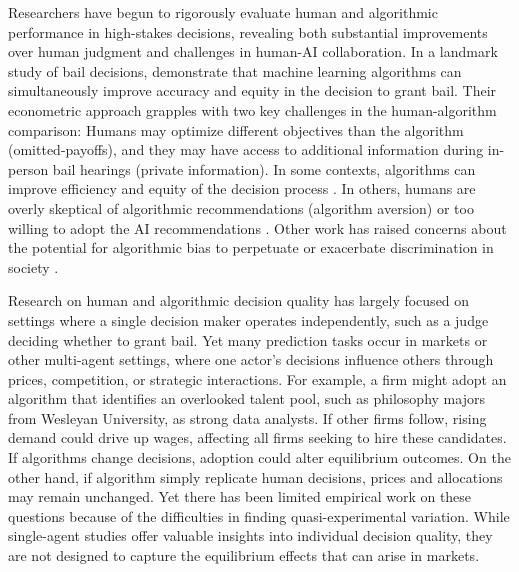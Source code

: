 \documentclass[11pt]{article}
\begin{document}
Researchers have begun to rigorously evaluate human and algorithmic performance in high-stakes decisions, revealing both substantial improvements over human judgment and challenges in human-AI collaboration. In a landmark study of bail decisions, \citet{kleinberg2017} demonstrate that machine learning algorithms can simultaneously improve accuracy and equity in the decision to grant bail. Their econometric approach grapples with two key challenges in the human-algorithm comparison: Humans may optimize different objectives than the algorithm (omitted-payoffs), and they may have access to additional information during in-person bail hearings (private information). %
In some contexts, algorithms can improve efficiency and equity of the decision process \citep[e.g.][]{li_hiring_2025, mullainathan_diagnosing_2022, rambachanIdentifyingPredictionMistakes, brynjolfsson_generative_2025, pmlr-v81-chouldechova18a, dobbiealgorecsbails2023, gruber_managing_2020}. In others, humans are overly skeptical of algorithmic recommendations (algorithm aversion) or too willing to adopt the AI recommendations \citep{vaccaro2024combinationshumansaiuseful, helanderHandbookHumanComputerInteraction2014, agarwalCombiningHumanExpertise, dietvorstAlgorithmAversionPeople2014, steyversThreeChallengesAIAssisted2024}. Other work has raised concerns about the potential for algorithmic bias to perpetuate or exacerbate discrimination in society \citep{rambachanalgobias2020, barocas-hardt-narayanan, chouldechovaroth2020}. 

Research on human and algorithmic decision quality has largely focused on settings where a single decision maker operates independently, such as a judge deciding whether to grant bail. Yet many prediction tasks occur in markets or other multi-agent settings, where one actor’s decisions influence others through prices, competition, or strategic interactions. For example, a firm might adopt an algorithm that identifies an overlooked talent pool, such as philosophy majors from Wesleyan University, as strong data analysts. If other firms follow, rising demand could drive up wages, affecting all firms seeking to hire these candidates. If algorithms change decisions, adoption could alter equilibrium outcomes.  On the other hand, if algorithm simply replicate human decisions, prices and allocations may remain unchanged. Yet there has been limited empirical work on these questions because of the difficulties in finding quasi-experimental variation. While single-agent studies offer valuable insights into individual decision quality, they are not designed to capture the equilibrium effects that can arise in markets.
\end{document}
